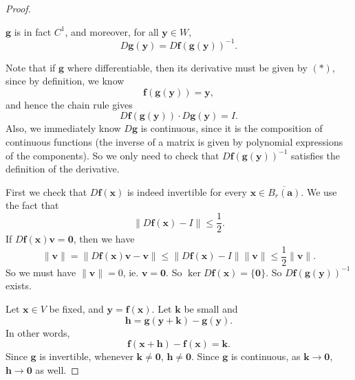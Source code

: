 \documentclass[a4paper]{article}
\begin{document}
\begin{proof}
  \begin{claim}
    $\mathbf{g}$ is in fact $C^1$, and moreover, for all $\mathbf{y} \in W$,
    \[
      D \mathbf{g}(\mathbf{y}) = D \mathbf{f}(\mathbf{g}(\mathbf{y}))^{-1}.\tag{$*$}
    \]
  \end{claim}
  Note that if $\mathbf{g}$ where differentiable, then its derivative must be given by $(*)$, since by definition, we know
  \[
    \mathbf{f}(\mathbf{g}(\mathbf{y})) = \mathbf{y},
  \]
  and hence the chain rule gives
  \[
    D \mathbf{f}(\mathbf{g}(\mathbf{y})) \cdot D \mathbf{g}(\mathbf{y}) = I.
  \]
  Also, we immediately know $D \mathbf{g}$ is continuous, since it is the composition of continuous functions (the inverse of a matrix is given by polynomial expressions of the components). So we only need to check that $D \mathbf{f}(\mathbf{g}(\mathbf{y}))^{-1}$ satisfies the definition of the derivative.

  First we check that $D\mathbf{f}(\mathbf{x})$ is indeed invertible for every $\mathbf{x} \in \overline{B_r(\mathbf{a})}$. We use the fact that
  \[
    \|D \mathbf{f}(\mathbf{x}) - I\| \leq \frac{1}{2}.
  \]
  If $D\mathbf{f}(\mathbf{x}) \mathbf{v} = \mathbf{0}$, then we have
  \[
    \|\mathbf{v}\| = \|D \mathbf{f}(\mathbf{x})\mathbf{v} - \mathbf{v}\| \leq \|D \mathbf{f}(\mathbf{x}) - I\| \|\mathbf{v}\| \leq \frac{1}{2} \|\mathbf{v}\|.
  \]
  So we must have $\|\mathbf{v}\| = 0$, ie. $\mathbf{v} = \mathbf{0}$. So $\ker D \mathbf{f}(\mathbf{x}) = \{\mathbf{0}\}$. So $D \mathbf{f}(\mathbf{g}(\mathbf{y}))^{-1}$ exists.

  Let $\mathbf{x} \in V$ be fixed, and $\mathbf{y} = \mathbf{f}(\mathbf{x})$. Let $\mathbf{k}$ be small and
  \[
    \mathbf{h} = \mathbf{g}(\mathbf{y} + \mathbf{k}) - \mathbf{g}(\mathbf{y}).
  \]
  In other words,
  \[
    \mathbf{f}(\mathbf{x} + \mathbf{h}) - \mathbf{f}(\mathbf{x}) = \mathbf{k}.
  \]
  Since $\mathbf{g}$ is invertible, whenever $\mathbf{k} \not= \mathbf{0}$, $\mathbf{h} \not= \mathbf{0}$. Since $\mathbf{g}$ is continuous, as $\mathbf{k} \to \mathbf{0}$, $\mathbf{h} \to \mathbf{0}$ as well.


\end{proof}
\end{document}
